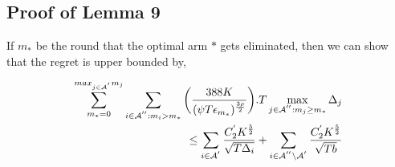\subsection{Proof of Lemma 9}
\label{App:Lemma:9}
\begin{lemma}
If $m_*$ be the round that the optimal arm $*$ gets eliminated, then we can show that the regret is upper bounded by,

\begin{align*}
\sum_{m_{*}=0}^{max_{j\in \mathcal{A}^{'}}m_{j}}\sum_{i\in \mathcal{A}^{''}:m_{i}>m_{*}}\bigg(\dfrac{388 K}{(\psi  T\epsilon_{m_{*}})^{\frac{3\rho}{2}}} \bigg).T\max_{j\in \mathcal{A}^{''}:m_{j}\geq m_{*}}{\Delta}_{j} \\
 \leq\sum_{i\in \mathcal{A}^{'}}\dfrac{C_2^{'} K^{\frac{5}{2}}}{\sqrt{T\Delta_i}} +\sum_{i\in \mathcal{A}^{''}\setminus \mathcal{A}^{'}}\dfrac{C_2^{'} K^{\frac{5}{2}}}{\sqrt{T b}}
\end{align*}

\end{lemma}

